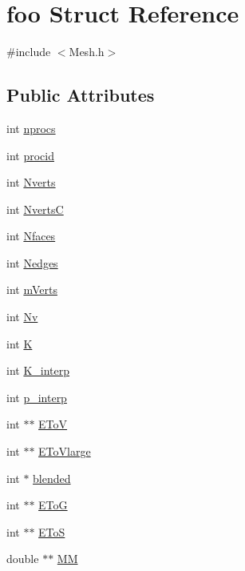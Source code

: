 \hypertarget{structfoo}{}\section{foo Struct Reference}
\label{structfoo}


{\ttfamily \#include $<$Mesh.\+h$>$}

\subsection*{Public Attributes}
\begin{DoxyCompactItemize}
\item 
int \hyperlink{structfoo_a3d147328a5e92ad9a1ce4c8a919300c2}{nprocs}
\item 
int \hyperlink{structfoo_a4c4307ab1e67ef6718f253bf30ba1c72}{procid}
\item 
int \hyperlink{structfoo_a01736638a000cfa8ea0c65e1eff9fc48}{Nverts}
\item 
int \hyperlink{structfoo_a8bbef66d4006f49c1ec3f511e4acca0b}{NvertsC}
\item 
int \hyperlink{structfoo_a63eedbb838a3db2003b254052163f82c}{Nfaces}
\item 
int \hyperlink{structfoo_a69273169f02e0667c6d527b99ccf587f}{Nedges}
\item 
int \hyperlink{structfoo_a48a09bec29d114b30166a1a05be4df1e}{m\+Verts}
\item 
int \hyperlink{structfoo_adc314e4fec517ae80875421478f0d167}{Nv}
\item 
int \hyperlink{structfoo_a88af07b45ff618ec46138685f5e3d144}{K}
\item 
int \hyperlink{structfoo_ab8d64d030cd334ddc0b21444b6adfbba}{K\+\_\+interp}
\item 
int \hyperlink{structfoo_a74235beaac11456dcd0a5ecc35bdebbb}{p\+\_\+interp}
\item 
int $\ast$$\ast$ \hyperlink{structfoo_a9941817e13f8f73ebac5999b2793839b}{E\+ToV}
\item 
int $\ast$$\ast$ \hyperlink{structfoo_ad59288de9be54a0976d1ba249864f295}{E\+To\+Vlarge}
\item 
int $\ast$ \hyperlink{structfoo_afffe0eef49bf522cb61782f657e5d543}{blended}
\item 
int $\ast$$\ast$ \hyperlink{structfoo_af82659aae195da07fcb4b7daf1b0e940}{E\+ToG}
\item 
int $\ast$$\ast$ \hyperlink{structfoo_a55fbc142eb8471d2775d4f0eae7026a2}{E\+ToS}
\item 
double $\ast$$\ast$ \hyperlink{structfoo_aa6f8e5d12c1f6f7da75147af74af971c}{MM}
$$
\end{DoxyCompactItemize}
